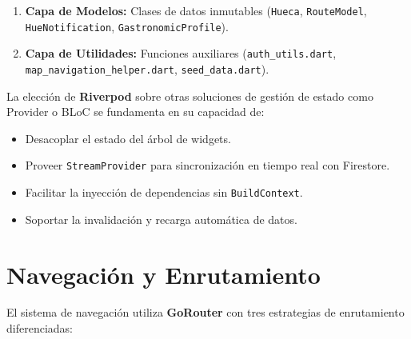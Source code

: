 \documentclass[11pt, a4paper, oneside]{report}
\begin{document}
\begin{enumerate}
  \begin{itemize}
    \item \texttt{DirectionsService}: Cálculo de rutas via Google Routes API.
    \item \texttt{GeocodingService}: Geocodificación directa e inversa con Google Geocoding API.
    \item \texttt{NotificationService}: Gestión de notificaciones locales de Android.
    \item \texttt{AiGenerationService}: Generación automática de descripciones con IA.
    \item \texttt{MenuOcrService}: Digitalización de menús físicos mediante OCR.
    \item \texttt{TranslationService}: Traducción automática español--inglés.
  \end{itemize}
  \item \textbf{Capa de Modelos:} Clases de datos inmutables (\texttt{Hueca}, \texttt{RouteModel}, \texttt{HueNotification}, \texttt{GastronomicProfile}).
  \item \textbf{Capa de Utilidades:} Funciones auxiliares (\texttt{auth\_utils.dart}, \texttt{map\_navigation\_helper.dart}, \texttt{seed\_data.dart}).
\end{enumerate}

\begin{decisionbox}
  La elección de \textbf{Riverpod} sobre otras soluciones de gestión de estado como Provider o BLoC se fundamenta en su capacidad de:
  \begin{itemize}
    \item Desacoplar el estado del árbol de widgets.
    \item Proveer \texttt{StreamProvider} para sincronización en tiempo real con Firestore.
    \item Facilitar la inyección de dependencias sin \texttt{BuildContext}.
    \item Soportar la invalidación y recarga automática de datos.
  \end{itemize}
\end{decisionbox}

\section{Navegación y Enrutamiento}

El sistema de navegación utiliza \textbf{GoRouter} con tres estrategias de enrutamiento diferenciadas:
\end{document}
